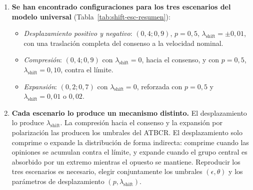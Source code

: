 \documentclass[11pt,a4paper]{article}
\begin{document}
\begin{enumerate}
    \item \textbf{Se han encontrado configuraciones para los tres escenarios del modelo universal} (Tabla~\ref{tab:shift-esc-resumen}):
    \begin{itemize}
        \item \emph{Desplazamiento positivo y negativo}: $(0{,}4;0{,}9)$, $p=0{,}5$, $\lambda_{\mathrm{shift}}=\pm0{,}01$, con una traslación completa del consenso a la velocidad nominal.
        \item \emph{Compresión}: $(0{,}4;0{,}9)$ con $\lambda_{\mathrm{shift}}=0$, hacia el consenso, y con $p=0{,}5$, $\lambda_{\mathrm{shift}}=0{,}10$, contra el límite.
        \item \emph{Expansión}: $(0{,}2;0{,}7)$ con $\lambda_{\mathrm{shift}}=0$, reforzada con $p=0{,}5$ y $\lambda_{\mathrm{shift}}=0{,}01$ o $0{,}02$.
    \end{itemize}

    \item \textbf{Cada escenario lo produce un mecanismo distinto.} El desplazamiento lo produce $\lambda_{\mathrm{shift}}$. La compresión hacia el consenso y la expansión por polarización las producen los umbrales del ATBCR. El desplazamiento solo comprime o expande la distribución de forma indirecta: comprime cuando las opiniones se acumulan contra el límite, y expande cuando el grupo central es absorbido por un extremo mientras el opuesto se mantiene. Reproducir los tres escenarios es necesario, elegir conjuntamente los umbrales $(\epsilon,\theta)$ y los parámetros de desplazamiento $(p,\lambda_{\mathrm{shift}})$.
\end{enumerate}
\end{document}
